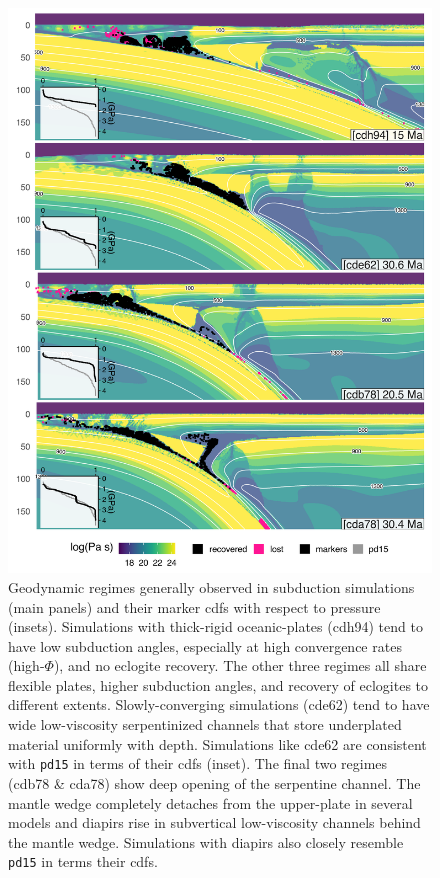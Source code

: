 \begin{figure}[htbp]

{\centering \includegraphics[width=0.85\linewidth,]{assets/figs/chpt4/geodynamics} 

}

\caption[Geodynamic regimes their probability distributions of recovered markers]{Geodynamic regimes generally observed in subduction simulations (main panels) and their marker \glspl{cdf} with respect to pressure (insets). Simulations with thick-rigid oceanic-plates (cdh94) tend to have low subduction angles, especially at high convergence rates (high-\(\Phi\)), and no eclogite recovery. The other three regimes all share flexible plates, higher subduction angles, and recovery of eclogites to different extents. Slowly-converging simulations (cde62) tend to have wide low-viscosity serpentinized channels that store underplated material uniformly with depth. Simulations like cde62 are consistent with \texttt{pd15} in terms of their \glspl{cdf} (inset). The final two regimes (cdb78 \& cda78) show deep opening of the serpentine channel. The mantle wedge completely detaches from the upper-plate in several models and diapirs rise in subvertical low-viscosity channels behind the mantle wedge. Simulations with diapirs also closely resemble \texttt{pd15} in terms their \glspl{cdf}.}\label{fig:geodyn}
\end{figure}

